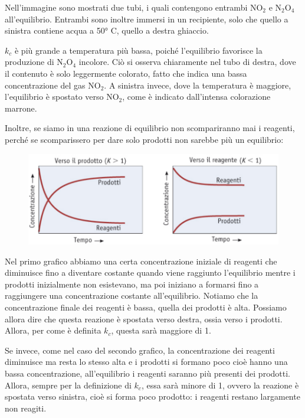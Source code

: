 Nell'immagine sono mostrati due tubi, i quali contengono entrambi NO$_2$ e N$_2$O$_4$ all'equilibrio. Entrambi sono inoltre immersi in un recipiente, solo che quello a sinistra contiene acqua a 50° C, quello a destra ghiaccio.

$k_c$ è più grande a temperatura più bassa, poiché l'equilibrio favorisce la produzione di N$_2$O$_4$ incolore. Ciò si osserva chiaramente nel tubo di destra, dove il contenuto è solo leggermente colorato, fatto che indica una bassa concentrazione del gas NO$_2$. A sinistra invece, dove la temperatura è maggiore, l'equilibrio è spostato verso NO$_2$, come è indicato dall'intensa colorazione marrone.

\vspace{0.2cm}Inoltre, se siamo in una reazione di equilibrio non scompariranno mai i reagenti, perché se scomparissero per dare solo prodotti non sarebbe più un equilibrio:

\begin{figure}[H]
    \centering
    \includegraphics[width=15cm]{immagini/reazioni_equilibrio_spostato.png}
\end{figure}

Nel primo grafico abbiamo una certa concentrazione iniziale di reagenti che diminuisce fino a diventare costante quando viene raggiunto l'equilibrio mentre i prodotti inizialmente non esistevano, ma poi iniziano a formarsi fino a raggiungere una concentrazione costante all'equilibrio. Notiamo che la concentrazione finale dei reagenti è bassa, quella dei prodotti è alta. Possiamo allora dire che questa reazione è spostata verso destra, ossia verso i prodotti. Allora, per come è definita $k_c$, questa sarà maggiore di 1.

Se invece, come nel caso del secondo grafico, la concentrazione dei reagenti diminuisce ma resta lo stesso alta e i prodotti si formano poco cioè hanno una bassa concentrazione, all'equilibrio i reagenti saranno più presenti dei prodotti. Allora, sempre per la definizione di $k_c$, essa sarà minore di 1, ovvero la reazione è spostata verso sinistra, cioè si forma poco prodotto: i reagenti restano largamente non reagiti.

